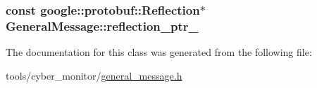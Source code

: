 \hypertarget{classGeneralMessage_ab56cddfdf8a104d774626dc1acd5f23d}{
\subsubsection[{reflection\-\_\-ptr\-\_\-}]{\setlength{\rightskip}{0pt plus 5cm}const google\-::protobuf\-::\-Reflection$\ast$ General\-Message\-::reflection\-\_\-ptr\-\_\-\hspace{0.3cm}{\ttfamily [private]}}}\label{classGeneralMessage_ab56cddfdf8a104d774626dc1acd5f23d}


The documentation for this class was generated from the following file\-:\begin{DoxyCompactItemize}
\item 
tools/cyber\-\_\-monitor/\hyperlink{general__message_8h}{general\-\_\-message.\-h}\end{DoxyCompactItemize}
